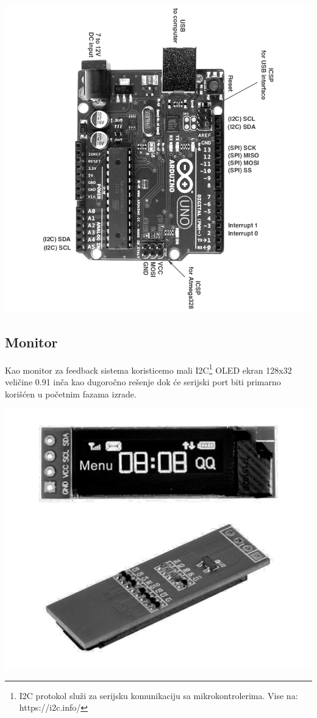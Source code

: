 \documentclass[a4paper,11pt]{book}
\begin{document}
\includegraphics[width=\textwidth]{uno_pinout.png}

\subsection{Monitor}
Kao monitor za feedback sistema koristicemo mali I2C\footnote{I2C protokol služi za serijsku komunikaciju sa mikrokontrolerima. Vise na: https://i2c.info/} OLED ekran 128x32 veličine 0.91 inča kao dugoročno rešenje dok će serijski port biti primarno korišćen u početnim fazama izrade.

\includegraphics[width=\textwidth]{oled.png}
\end{document}
